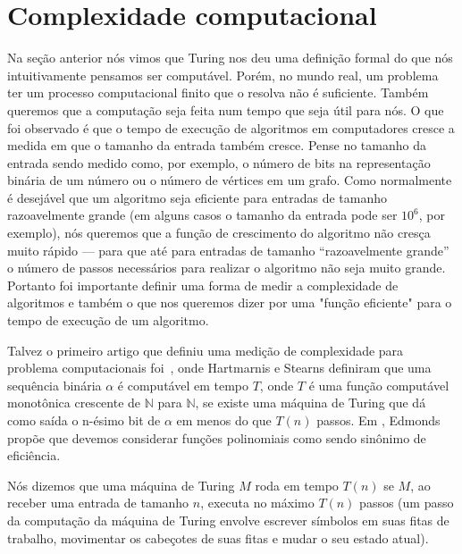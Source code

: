 \section{Complexidade computacional} \label{complexidade}

Na seção anterior nós vimos que Turing nos deu uma definição formal do que nós intuitivamente pensamos ser computável. Porém, no mundo real, um problema ter um processo computacional finito que o resolva não é suficiente. Também queremos que a computação seja feita num tempo que seja útil para nós. O que foi observado é que o tempo de execução de algoritmos em computadores cresce a medida em que o tamanho da entrada também cresce. Pense no tamanho da entrada sendo medido como, por exemplo, o número de bits na representação binária de um número ou o número de vértices em um grafo. Como normalmente é desejável que um algoritmo seja eficiente para entradas de tamanho razoavelmente grande (em alguns casos o tamanho da entrada pode ser $10^6$, por exemplo), nós queremos que a função de crescimento do algoritmo não cresça muito rápido --- para que até para entradas de tamanho ``razoavelmente grande'' o número de passos necessários para realizar o algoritmo não seja muito grande. Portanto foi importante definir uma forma de medir a complexidade de algoritmos e também o que nos queremos dizer por uma "função eficiente" para o tempo de execução de um algoritmo.

Talvez o primeiro artigo que definiu uma medição de complexidade para problema computacionais foi~\cite{hartmanis1965computational}, onde Hartmarnis e Stearns definiram que uma sequência binária $\alpha$ é computável em tempo $T$, onde $T$ é uma função computável monotônica crescente de $\mathbb{N}$ para $\mathbb{N}$, se existe uma máquina de Turing que dá como saída o n-ésimo bit de $\alpha$ em menos do que $T(n)$ passos. Em \cite{edmonds1965paths}, Edmonds propõe que devemos considerar funções polinomiais como sendo sinônimo de eficiência.

Nós dizemos que uma máquina de Turing $M$ roda em tempo $T(n)$ se $M$, ao receber uma entrada de tamanho $n$, executa no máximo $T(n)$ passos (um passo da computação da máquina de Turing envolve escrever símbolos em suas fitas de trabalho, movimentar os cabeçotes de suas fitas e mudar o seu estado atual).

